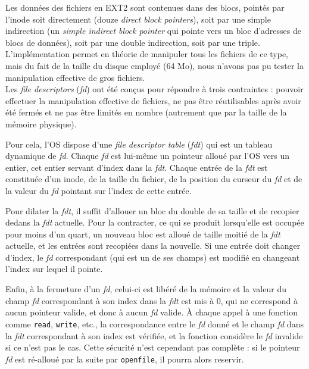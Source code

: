 \documentclass[a4paper, 10pt, french]{article}
\newcommand{\foreign}[1]{\emph{#1}}
\begin{document}
		Les données des fichiers en EXT2 sont contenues dans des blocs, 
pointés par l'inode soit directement (douze \foreign{direct block pointers}), 
soit par une simple indirection (un \foreign{simple indirect block pointer} qui 
pointe vers un bloc d'adresses de blocs de données), soit par une double 
indirection, soit par une triple. L'implémentation permet en théorie de 
manipuler tous les fichiers de ce type, mais du fait de la taille du disque 
employé (64 Mo), nous n'avons pas pu tester la manipulation effective de gros 
fichiers.\\
		
		Les \foreign{file descriptors} (\foreign{fd}) ont été conçus 
pour répondre à trois contraintes : pouvoir effectuer la manipulation effective 
de fichiers, ne pas être réutilisables après avoir été fermés et ne pas être 
limités en nombre (autrement que par la taille de la mémoire physique). 
		
		Pour cela, l'OS dispose d'une \foreign{file descriptor table} 
(\foreign{fdt}) qui est un tableau dynamique de \foreign{fd}. Chaque 
\foreign{fd} est lui-même un pointeur alloué par l'OS vers un entier, cet entier 
servant d'index dans la \foreign{fdt}. Chaque entrée de la \foreign{fdt} est 
constituée d'un inode, de la taille du fichier, de la position du curseur du 
\foreign{fd} et de la valeur du \foreign{fd} pointant sur l'index de cette 
entrée.
		
		Pour dilater la \foreign{fdt}, il suffit d'allouer un bloc du 
double de sa taille et de recopier dedans la \foreign{fdt} actuelle. Pour la 
contracter, ce qui se produit lorsqu'elle est occupée pour moins d'un quart, un 
nouveau bloc est alloué de taille moitié de la \foreign{fdt} actuelle, et les 
entrées sont recopiées dans la nouvelle. Si une entrée doit changer d'index, le 
\foreign{fd} correspondant (qui est un de ses champs) est modifié en changeant 
l'index sur lequel il pointe.
		
		Enfin, à la fermeture d'un \foreign{fd}, celui-ci est libéré de 
la mémoire et la valeur du champ \foreign{fd} correspondant à son index dans la 
\foreign{fdt} est mis à 0, qui ne correspond à aucun pointeur valide, et donc à 
aucun \foreign{fd} valide. À chaque appel à une fonction comme \verb|read|, 
\verb|write|, etc., la correspondance entre le \foreign{fd} donné et le champ 
\foreign{fd} dans la \foreign{fdt} correspondant à son index est vérifiée, et la 
fonction considère le \foreign{fd} invalide si ce n'est pas le cas. Cette 
sécurité n'est cependant pas complète : si le pointeur \foreign{fd} est 
ré-alloué par la suite par \verb|openfile|, il pourra alors reservir.
	
\end{document}
